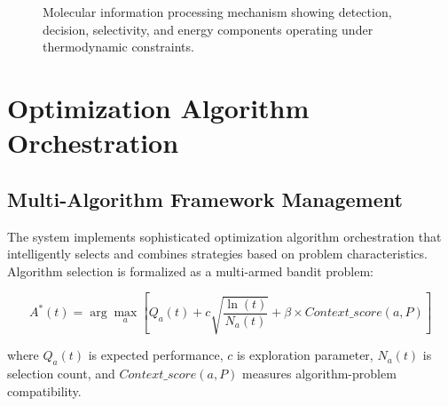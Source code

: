 \documentclass[12pt,a4paper]{article}
\begin{document}
\begin{figure}[H]
\centering
{}
\caption{Molecular information processing mechanism showing detection, decision, selectivity, and energy components operating under thermodynamic constraints.}
\label{fig:molecular_processor}
\end{figure}

\section{Optimization Algorithm Orchestration}

\subsection{Multi-Algorithm Framework Management}

The system implements sophisticated optimization algorithm orchestration that intelligently selects and combines strategies based on problem characteristics. Algorithm selection is formalized as a multi-armed bandit problem:

\begin{equation}
A^*(t) = \arg\max_a \left[Q_a(t) + c\sqrt{\frac{\ln(t)}{N_a(t)}} + \beta \times Context\_score(a,P)\right]
\label{eq:algorithm_selection}
\end{equation}

where $Q_a(t)$ is expected performance, $c$ is exploration parameter, $N_a(t)$ is selection count, and $Context\_score(a,P)$ measures algorithm-problem compatibility.
\end{document}
